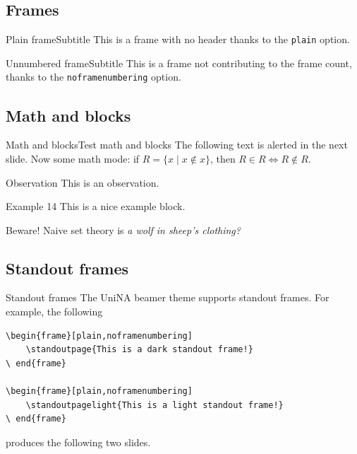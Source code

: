 \documentclass[10pt,aspectratio=169
	]{beamer}
\begin{document}
\subsection{Frames}

\begin{frame}[plain]{Plain frame}{Subtitle}
	This is a frame with no header thanks to the \texttt{plain} option.
\end{frame}

\begin{frame}[noframenumbering]{Unnumbered frame}{Subtitle}
	This is a frame not contributing to the frame count, thanks to the \texttt{noframenumbering} option.
\end{frame}

\subsection{Math and blocks}

\begin{frame}{Math and blocks}{Test math and blocks}
	The following text is \alert<2>{alerted} in the next slide. 
	Now some math mode:
	if $R=\{x\mid x\not\in x\}$, then $R\in R \Leftrightarrow R\not\in R$.
	\begin{block}{Observation}
	This is an observation.
	\end{block}
	\begin{exampleblock}{Example 14}
	This is a nice example block.
	\end{exampleblock}
	\begin{alertblock}{Beware!}
	Naive set theory is \emph{a wolf in sheep's clothing?}
	\end{alertblock}
\end{frame}

\subsection{Standout frames}


\begin{frame}[fragile]{Standout frames}{}
	The UniNA beamer theme supports standout frames. For example, the following
	\begin{verbatim}
\begin{frame}[plain,noframenumbering]
	\standoutpage{This is a dark standout frame!}
\ end{frame}

\begin{frame}[plain,noframenumbering]
	\standoutpagelight{This is a light standout frame!}
\ end{frame}
	\end{verbatim}
	produces the following two slides.
\end{frame}
\end{document}
